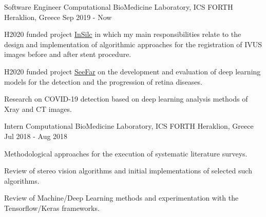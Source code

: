 

\begin{cventries}

  \cventry
    {Software Engineer} %
    {Computational BioMedicine Laboratory, ICS FORTH} %
    {Heraklion, Greece} %
    {Sep 2019 - Now} %
    {
      \begin{cvitems} %
        \item {H2020 funded project \href{https://insilc.eu/}{InSilc} in which my main responsibilities relate to the design and implementation of algorithmic approaches for the registration of IVUS images before and after stent procedure.}
        \item {H2020 funded project \href{https://www.see-far.eu/}{SeeFar}  on the development and evaluation of deep learning models for the detection and the progression of retina diseases.}
        \item {Research on COVID-19 detection based on deep learning analysis methods of Xray and CT images.}
      \end{cvitems}
    }

  \cventry
    {Intern} %
    {Computational BioMedicine Laboratory, ICS FORTH} %
    {Heraklion, Greece} %
    {Jul 2018 - Aug 2018} %
    {
      \begin{cvitems} %
        \item {Methodological approaches for the execution of systematic literature surveys.}
        \item {Review of stereo vision algorithms and initial implementations of selected such algorithms.}
        \item {Review of Machine/Deep Learning methods and experimentation with the Tensorflow/Keras frameworks.}
      \end{cvitems}
    }

\end{cventries}
